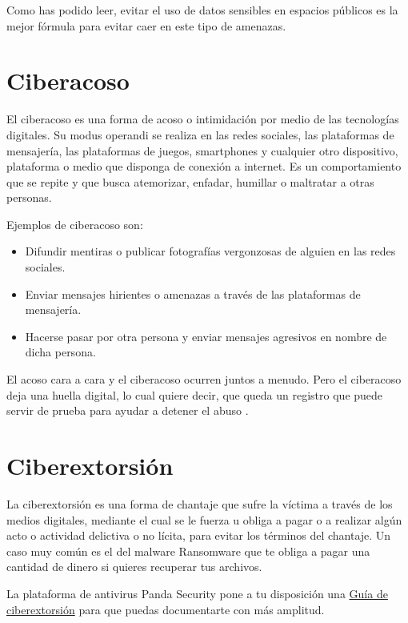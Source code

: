 \documentclass[
  spanish,
  a4paper,
  openany]{book}
\begin{document}
Como has podido leer, evitar el uso de datos sensibles en espacios públicos es la mejor fórmula para evitar caer en este tipo de amenazas.

\hypertarget{ciberacoso}{%
\section{Ciberacoso}\label{ciberacoso}}

El ciberacoso es una forma de acoso o intimidación por medio de las tecnologías digitales. Su modus operandi se realiza en las redes sociales, las plataformas de mensajería, las plataformas de juegos, smartphones y cualquier otro dispositivo, plataforma o medio que disponga de conexión a internet. Es un comportamiento que se repite y que busca atemorizar, enfadar, humillar o maltratar a otras personas.

Ejemplos de ciberacoso son:

\begin{itemize}
\item
  Difundir mentiras o publicar fotografías vergonzosas de alguien en las redes sociales.
\item
  Enviar mensajes hirientes o amenazas a través de las plataformas de mensajería.
\item
  Hacerse pasar por otra persona y enviar mensajes agresivos en nombre de dicha persona.
\end{itemize}

El acoso cara a cara y el ciberacoso ocurren juntos a menudo. Pero el ciberacoso deja una huella digital, lo cual quiere decir, que queda un registro que puede servir de prueba para ayudar a detener el abuso \citep{ciberacoso}.

\hypertarget{ciberextorsiuxf3n}{%
\section{Ciberextorsión}\label{ciberextorsiuxf3n}}

La ciberextorsión es una forma de chantaje que sufre la víctima a través de los medios digitales, mediante el cual se le fuerza u obliga a pagar o a realizar algún acto o actividad delictiva o no lícita, para evitar los términos del chantaje. Un caso muy común es el del malware Ransomware que te obliga a pagar una cantidad de dinero si quieres recuperar tus archivos.

La plataforma de antivirus Panda Security pone a tu disposición una \href{https://www.pandasecurity.com/es/mediacenter/src/uploads/2016/02/Guia_Ciberextorsion-es.pdf}{Guía de ciberextorsión} para que puedas documentarte con más amplitud.
\end{document}
